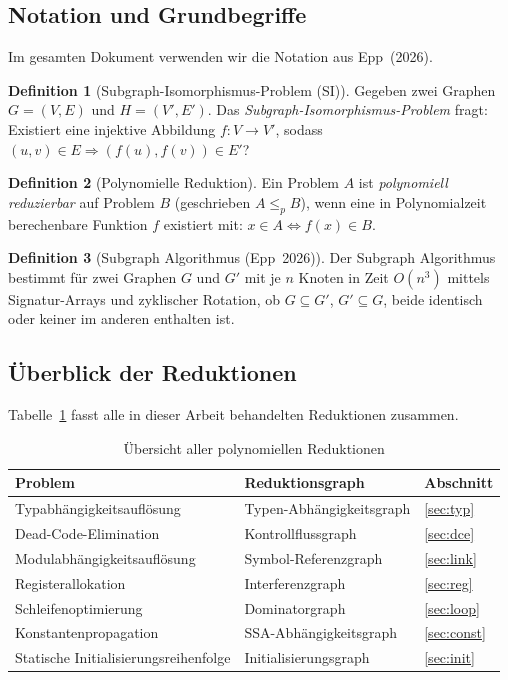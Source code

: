 ﻿\documentclass[a4paper,12pt]{article}
\theoremstyle{definition}
\newtheorem{definition}{Definition}
\begin{document}
\subsection{Notation und Grundbegriffe}

Im gesamten Dokument verwenden wir die Notation aus Epp~(2026).

\begin{definition}[Subgraph-Isomorphismus-Problem (SI)]
\label{def:si}
Gegeben zwei Graphen $G = (V, E)$ und $H = (V', E')$. Das \emph{Subgraph-Isomorphismus-Problem} fragt: Existiert eine injektive Abbildung $f: V \to V'$, sodass $(u, v) \in E \Rightarrow (f(u), f(v)) \in E'$?
\end{definition}

\begin{definition}[Polynomielle Reduktion]
Ein Problem $A$ ist \emph{polynomiell reduzierbar} auf Problem $B$ (geschrieben $A \leq_p B$), wenn eine in Polynomialzeit berechenbare Funktion $f$ existiert mit: $x \in A \Leftrightarrow f(x) \in B$.
\end{definition}

\begin{definition}[Subgraph Algorithmus (Epp~2026)]
\label{def:subgraph-algo}
Der Subgraph Algorithmus bestimmt für zwei Graphen $G$ und $G'$ mit je $n$ Knoten in Zeit $O(n^3)$ mittels Signatur-Arrays und zyklischer Rotation, ob $G \subseteq G'$, $G' \subseteq G$, beide identisch oder keiner im anderen enthalten ist.
\end{definition}

\subsection{Überblick der Reduktionen}

Tabelle~\ref{tab:uebersicht} fasst alle in dieser Arbeit behandelten Reduktionen zusammen.

\begin{table}[h!]
\centering
\renewcommand{\arraystretch}{1.4}
\begin{tabular}{|l|l|l|}
\hline
\textbf{Problem} & \textbf{Reduktionsgraph} & \textbf{Abschnitt} \\
\hline
Typabhängigkeitsauflösung & Typen-Abhängigkeitsgraph & \ref{sec:typ} \\
Dead-Code-Elimination & Kontrollflussgraph & \ref{sec:dce} \\
Modulabhängigkeitsauflösung & Symbol-Referenzgraph & \ref{sec:link} \\
Registerallokation & Interferenzgraph & \ref{sec:reg} \\
Schleifenoptimierung & Dominatorgraph & \ref{sec:loop} \\
Konstantenpropagation & SSA-Abhängigkeitsgraph & \ref{sec:const} \\
Statische Initialisierungsreihenfolge & Initialisierungsgraph & \ref{sec:init} \\
\hline
\end{tabular}
\caption{Übersicht aller polynomiellen Reduktionen}
\label{tab:uebersicht}
\end{table}
\end{document}
